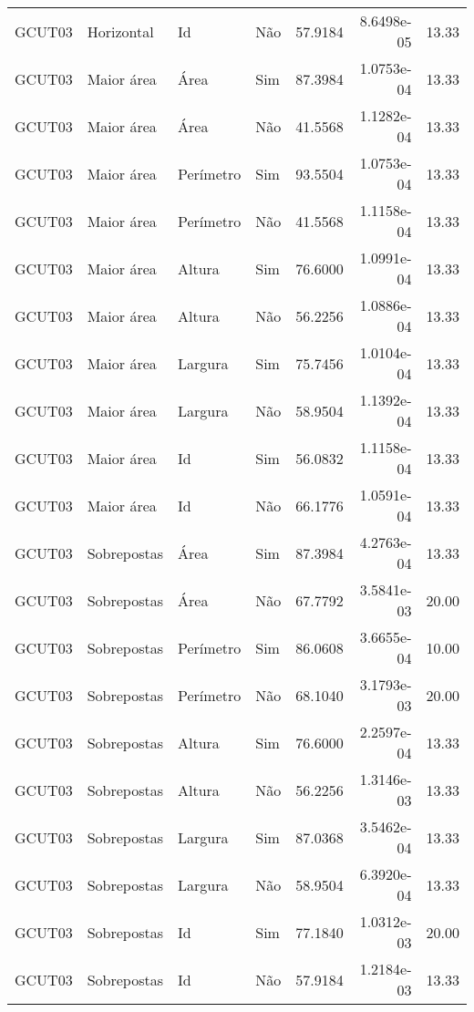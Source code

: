 \begin{tabular}{llllrrr}
GCUT03    & Horizontal  & Id        & Não         & 57.9184      & 8.6498e-05 & 13.33    \\
GCUT03    & Maior área  & Área      & Sim         & 87.3984      & 1.0753e-04 & 13.33    \\
GCUT03    & Maior área  & Área      & Não         & 41.5568      & 1.1282e-04 & 13.33    \\
GCUT03    & Maior área  & Perímetro & Sim         & 93.5504      & 1.0753e-04 & 13.33    \\
GCUT03    & Maior área  & Perímetro & Não         & 41.5568      & 1.1158e-04 & 13.33    \\
GCUT03    & Maior área  & Altura    & Sim         & 76.6000      & 1.0991e-04 & 13.33    \\
GCUT03    & Maior área  & Altura    & Não         & 56.2256      & 1.0886e-04 & 13.33    \\
GCUT03    & Maior área  & Largura   & Sim         & 75.7456      & 1.0104e-04 & 13.33    \\
GCUT03    & Maior área  & Largura   & Não         & 58.9504      & 1.1392e-04 & 13.33    \\
GCUT03    & Maior área  & Id        & Sim         & 56.0832      & 1.1158e-04 & 13.33    \\
GCUT03    & Maior área  & Id        & Não         & 66.1776      & 1.0591e-04 & 13.33    \\
GCUT03    & Sobrepostas & Área      & Sim         & 87.3984      & 4.2763e-04 & 13.33    \\
GCUT03    & Sobrepostas & Área      & Não         & 67.7792      & 3.5841e-03 & 20.00    \\
GCUT03    & Sobrepostas & Perímetro & Sim         & 86.0608      & 3.6655e-04 & 10.00    \\
GCUT03    & Sobrepostas & Perímetro & Não         & 68.1040      & 3.1793e-03 & 20.00    \\
GCUT03    & Sobrepostas & Altura    & Sim         & 76.6000      & 2.2597e-04 & 13.33    \\
GCUT03    & Sobrepostas & Altura    & Não         & 56.2256      & 1.3146e-03 & 13.33    \\
GCUT03    & Sobrepostas & Largura   & Sim         & 87.0368      & 3.5462e-04 & 13.33    \\
GCUT03    & Sobrepostas & Largura   & Não         & 58.9504      & 6.3920e-04 & 13.33    \\
GCUT03    & Sobrepostas & Id        & Sim         & 77.1840      & 1.0312e-03 & 20.00    \\
GCUT03    & Sobrepostas & Id        & Não         & 57.9184      & 1.2184e-03 & 13.33    \\
\hline
\end{tabular}